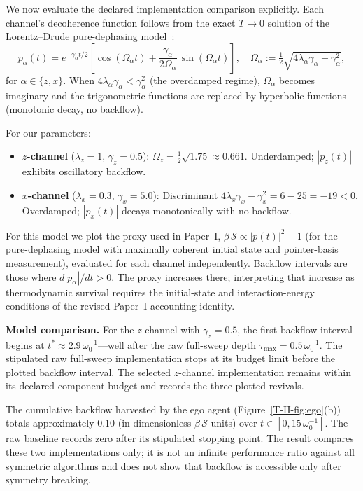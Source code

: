 \documentclass[12pt,a4paper,openany]{book}
\begin{document}
We now evaluate the declared implementation comparison explicitly.
Each channel's decoherence function follows from the exact
$T \to 0$ solution of the Lorentz--Drude pure-dephasing
model~\cite{BreuerPetruccione2002,Liu2026TDOME_I}:
\begin{equation}
\label{T-II-eq:decoherence_II}
p_\alpha(t) = e^{-\gamma_\alpha t/2}\!\left[
  \cos(\Omega_\alpha t)
  + \frac{\gamma_\alpha}{2\Omega_\alpha}\,
    \sin(\Omega_\alpha t)
\right],
\quad
\Omega_\alpha
:= \tfrac{1}{2}\sqrt{4\lambda_\alpha\gamma_\alpha
   - \gamma_\alpha^2},
\end{equation}
for $\alpha \in \{z, x\}$.
When $4\lambda_\alpha\gamma_\alpha < \gamma_\alpha^2$
(the overdamped regime), $\Omega_\alpha$ becomes imaginary
and the trigonometric functions are replaced by hyperbolic
functions (monotonic decay, no backflow).

For our parameters:
\begin{itemize}
\item \textbf{$z$-channel} ($\lambda_z = 1$,
  $\gamma_z = 0.5$):
  $\Omega_z = \frac{1}{2}\sqrt{1.75} \approx 0.661$.
  Underdamped; $|p_z(t)|$ exhibits oscillatory backflow.
\item \textbf{$x$-channel} ($\lambda_x = 0.3$,
  $\gamma_x = 5.0$):
  Discriminant $4\lambda_x\gamma_x - \gamma_x^2
  = 6 - 25 = -19 < 0$.
  Overdamped; $|p_x(t)|$ decays monotonically with no
  backflow.
\end{itemize}

For this model we plot the proxy used in Paper~I,
$\beta\,\mathcal{S} \propto |p(t)|^2 - 1$
(for the pure-dephasing model with maximally coherent
initial state and pointer-basis measurement), evaluated
for each channel independently.
Backflow intervals are those where $d|p_\alpha|/dt>0$.  The proxy
increases there; interpreting that increase as thermodynamic survival
requires the initial-state and interaction-energy conditions of the
revised Paper~I accounting identity.

\textbf{Model comparison.}
For the $z$-channel with $\gamma_z = 0.5$, the first
backflow interval begins at
$t^* \approx 2.9\,\omega_0^{-1}$---well after the raw
full-sweep depth $\tau_{\max} = 0.5\,\omega_0^{-1}$.
The stipulated raw full-sweep implementation stops at its budget limit
before the plotted backflow interval.  The selected $z$-channel
implementation remains within its declared component budget and records
the three plotted revivals.

The cumulative backflow harvested by the ego agent
(Figure~\ref{T-II-fig:ego}(b)) totals approximately $0.10$
(in dimensionless $\beta\,\mathcal{S}$ units) over
$t \in [0, 15\,\omega_0^{-1}]$.
The raw baseline records zero after its stipulated stopping point.  The
result compares these two implementations only; it is not an infinite
performance ratio against all symmetric algorithms and does not show
that backflow is accessible only after symmetry breaking.
\end{document}
